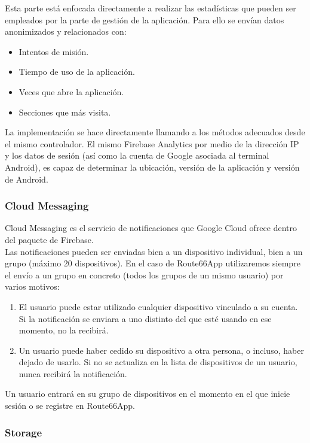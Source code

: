 \documentclass[twoside]{report}
\begin{document}
Esta parte está enfocada directamente a realizar las estadísticas que pueden ser empleados por la parte de gestión de la aplicación. Para ello se envían datos anonimizados y relacionados con:

\begin{itemize}
\item Intentos de misión.
\item Tiempo de uso de la aplicación.
\item Veces que abre la aplicación.
\item Secciones que más visita.
\end{itemize}

La implementación se hace directamente llamando a los métodos adecuados desde el mismo controlador. El mismo Firebase Analytics por medio de la dirección IP y los datos de sesión (así como la cuenta de Google asociada al terminal Android), es capaz de determinar la ubicación, versión de la aplicación y versión de Android.

\subsubsection{Cloud Messaging}

Cloud Messaging es el servicio de notificaciones que Google Cloud ofrece dentro del paquete de Firebase. \\

Las notificaciones pueden ser enviadas bien a un dispositivo individual, bien a un grupo (máximo 20 dispositivos). En el caso de Route66App utilizaremos siempre el envío a un grupo en concreto (todos los grupos de un mismo usuario) por varios motivos:

\begin{enumerate}
\item El usuario puede estar utilizado cualquier dispositivo vinculado a su cuenta. Si la notificación se enviara a uno distinto del que esté usando en ese momento, no la recibirá.

\item Un usuario puede haber cedido su dispositivo a otra persona, o incluso, haber dejado de usarlo. Si no se actualiza en la lista de dispositivos de un usuario, nunca recibirá la notificación.
\end{enumerate}

Un usuario entrará en su grupo de dispositivos en el momento en el que inicie sesión o se registre en Route66App.

\subsubsection{Storage}
\end{document}
